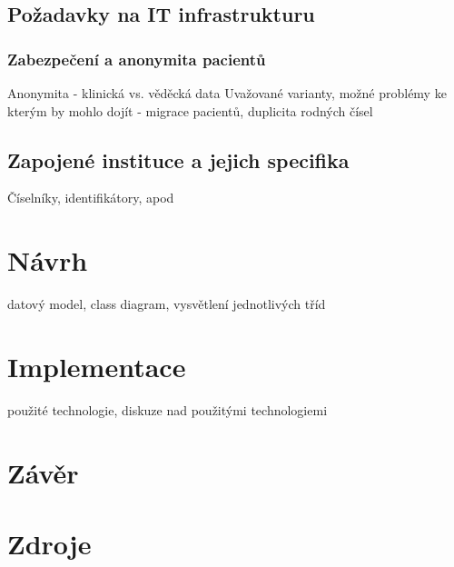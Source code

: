 \documentclass[11pt,draft,oneside]{fithesis2}
\begin{document}
\section{Požadavky na IT infrastrukturu}

\subsection{Zabezpečení a anonymita pacientů}

Anonymita - klinická vs. věděcká data
Uvažované varianty, možné problémy ke kterým by mohlo dojít - migrace pacientů, duplicita rodných čísel

\section{Zapojené instituce a jejich specifika}
Číselníky, identifikátory, apod



\chapter{Návrh}
datový model, class diagram, vysvětlení jednotlivých tříd

\chapter{Implementace}
použité technologie, diskuze nad použitými technologiemi

\chapter{Závěr}

\printindex
\printglossary
\listoffigures
\listoftables

\begingroup
\def\tmpchapter{0}
\renewcommand{\chaptername}{}
\renewcommand{\thechapter}{}
\chapter{Zdroje}
\renewcommand{\chapter}[2]{}%




\endgroup

\appendix

\end{document}
